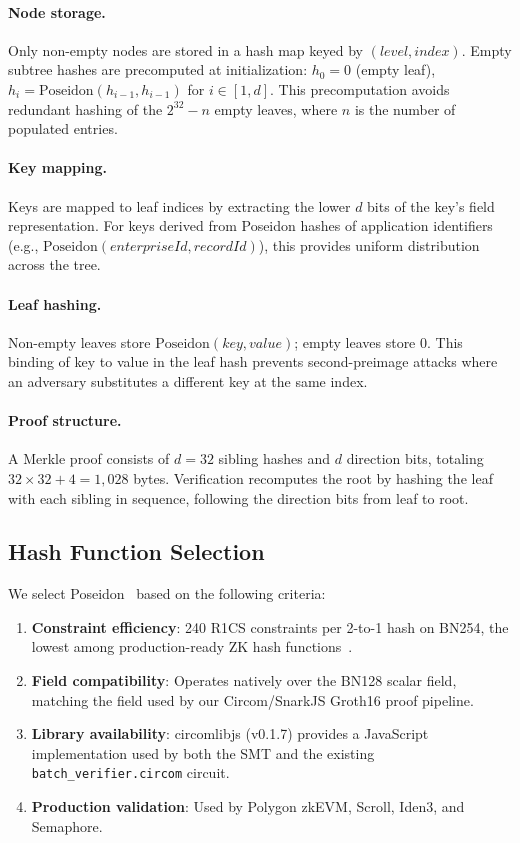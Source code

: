 \paragraph{Node storage.} Only non-empty nodes are stored in a hash map keyed by $(level, index)$. Empty subtree hashes are precomputed at initialization: $h_0 = 0$ (empty leaf), $h_i = \text{Poseidon}(h_{i-1}, h_{i-1})$ for $i \in [1, d]$. This precomputation avoids redundant hashing of the $2^{32} - n$ empty leaves, where $n$ is the number of populated entries.

\paragraph{Key mapping.} Keys are mapped to leaf indices by extracting the lower $d$ bits of the key's field representation. For keys derived from Poseidon hashes of application identifiers (e.g., $\text{Poseidon}(\textit{enterpriseId}, \textit{recordId})$), this provides uniform distribution across the tree.

\paragraph{Leaf hashing.} Non-empty leaves store $\text{Poseidon}(key, value)$; empty leaves store $0$. This binding of key to value in the leaf hash prevents second-preimage attacks where an adversary substitutes a different key at the same index.

\paragraph{Proof structure.} A Merkle proof consists of $d = 32$ sibling hashes and $d$ direction bits, totaling $32 \times 32 + 4 = 1{,}028$ bytes. Verification recomputes the root by hashing the leaf with each sibling in sequence, following the direction bits from leaf to root.

\subsection{Hash Function Selection}

We select Poseidon~\cite{grassi2021poseidon} based on the following criteria:

\begin{enumerate}
  \item \textbf{Constraint efficiency}: 240 R1CS constraints per 2-to-1 hash on BN254, the lowest among production-ready ZK hash functions~\cite{guohanze2024benchmarking}.
  \item \textbf{Field compatibility}: Operates natively over the BN128 scalar field, matching the field used by our Circom/SnarkJS Groth16 proof pipeline.
  \item \textbf{Library availability}: circomlibjs (v0.1.7) provides a JavaScript implementation used by both the SMT and the existing \texttt{batch\_verifier.circom} circuit.
  \item \textbf{Production validation}: Used by Polygon zkEVM, Scroll, Iden3, and Semaphore.
\end{enumerate}

